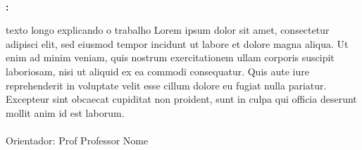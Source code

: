 
\begin{center}

    \thispagestyle{pretext}
    \ \\ 

    \begin{large}
        \printAuthors
    \end{large}
    

    \vfill

    \begin{Large}
        \textbf{\uppercase\expandafter{\TitleName}:} \\
        \textbf{\uppercase\expandafter{\SubtitleName}}
    \end{Large}

\end{center}

\vspace{3em}

\begin{adjustwidth}{7.5cm}{}
    \noindent texto longo explicando o trabalho Lorem ipsum dolor sit amet, consectetur adipisci elit, sed eiusmod tempor incidunt ut labore et dolore magna aliqua. Ut enim ad minim veniam, quis nostrum exercitationem ullam corporis suscipit laboriosam, nisi ut aliquid ex ea commodi consequatur. Quis aute iure reprehenderit in voluptate velit esse cillum dolore eu fugiat nulla pariatur. Excepteur sint obcaecat cupiditat non proident, sunt in culpa qui officia deserunt mollit anim id est laborum. \\ \ \\
    Orientador: Prof Professor Nome
\end{adjustwidth}

\vfill

\begin{center}
    \begin{large}
        \printCity \\
        \the \year
    \end{large}
\end{center}

\newpage